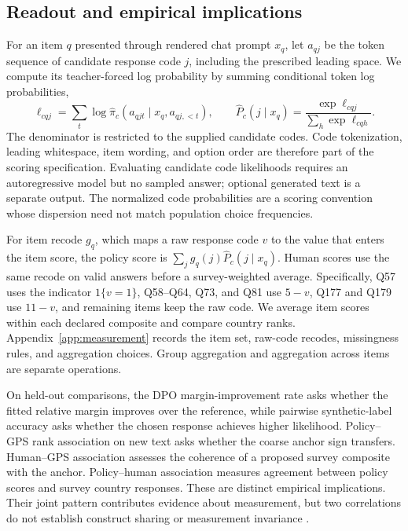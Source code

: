 \subsection{Readout and empirical implications}
For an item $q$ presented through rendered chat prompt $x_q$, let $a_{qj}$ be the token sequence of candidate response code $j$, including the prescribed leading space. We compute its teacher-forced log probability by summing conditional token log probabilities,
\begin{equation}
\ell_{cqj}=\sum_t\log\widehat\pi_c(a_{qjt}\mid x_q,a_{qj,<t}),\qquad
\widehat P_c(j\mid x_q)=\frac{\exp\ell_{cqj}}{\sum_h\exp\ell_{cqh}}.
\label{eq:readout}
\end{equation}
The denominator is restricted to the supplied candidate codes. Code tokenization, leading whitespace, item wording, and option order are therefore part of the scoring specification. Evaluating candidate code likelihoods requires an autoregressive model but no sampled answer; optional generated text is a separate output. The normalized code probabilities are a scoring convention whose dispersion need not match population choice frequencies.

For item recode $g_q$, which maps a raw response code $v$ to the value that enters the item score, the policy score is $\sum_jg_q(j)\widehat P_c(j\mid x_q)$. Human scores use the same recode on valid answers before a survey-weighted average. Specifically, Q57 uses the indicator $1\{v=1\}$, Q58--Q64, Q73, and Q81 use $5-v$, Q177 and Q179 use $11-v$, and remaining items keep the raw code. We average item scores within each declared composite and compare country ranks. Appendix~\ref{app:measurement} records the item set, raw-code recodes, missingness rules, and aggregation choices. Group aggregation and aggregation across items are separate operations.

On held-out comparisons, the DPO margin-improvement rate asks whether the fitted relative margin improves over the reference, while pairwise synthetic-label accuracy asks whether the chosen response achieves higher likelihood. Policy--GPS rank association on new text asks whether the coarse anchor sign transfers. Human--GPS association assesses the coherence of a proposed survey composite with the anchor. Policy--human association measures agreement between policy scores and survey country responses. These are distinct empirical implications. Their joint pattern contributes evidence about measurement, but two correlations do not establish construct sharing or measurement invariance \cite{campbellfiske1959,davidov2014,steenkamp1998}.

